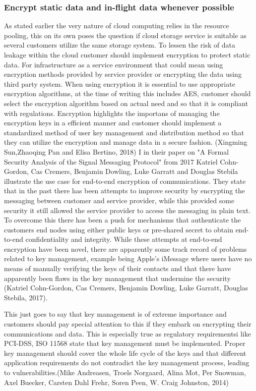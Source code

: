 \documentclass{article}
\begin{document}
\subsubsection{Encrypt static data and in-flight data whenever possible}
As stated earlier the very nature of cloud computing relies in the resource pooling, this on its own poses the question if cloud storage service is suitable as several customers utilize the same storage system. To lessen the risk of data leakage within the cloud customer should implement encryption to protect static data. For infrastructure as a service environment that could mean using encryption methods provided by service provider or encrypting the data using third party system. When using encryption it is essential to use appropriate encryption algorithms, at the time of writing this includes AES, customer should select the encryption algorithm based on actual need and so that it is compliant with regulations. Encryption highlights the importans of managing the encryption keys in a efficient manner and customer should implement a standardized method of user key management and distribution method so that they can utilize the encryption and manage data in a secure fashion. (Xingming Sun,Zhaoqing Pan and Elisa Bertino, 2018)
I in their paper on "A Formal Security Analysis of the Signal Messaging Protocol" from 2017 Katriel Cohn-Gordon, Cas Cremers, Benjamin Dowling, Luke Garratt and Douglas Stebila illustrate the use case for end-to-end encryption of communications.
They state that in the past there has been attempts to improve security by encrypting the messaging between customer and service provider, while this provided some security it still allowed the service provider to access the messaging in plain text.
To overcome this there has been a push for mechanisms that authenticate the customers end nodes using either public keys or pre-shared secret to obtain end-to-end confidentiality and integrity.
While these attempts at end-to-end encryption have been novel, there are apparently some track record of problems related to key management, example being Apple's iMessage where users have no means of manually verifying the keys of their contacts and that there have apparently been flaws in the key management that undermine the security (Katriel Cohn-Gordon, Cas Cremers, Benjamin Dowling, Luke Garratt, Douglas Stebila, 2017).
\par
This just goes to say that key management is of extreme importance and customers should pay special attention to this if they embark on encrypting their communications and data. This is especially true as regulatory requirementsi like PCI-DSS, ISO 11568 state that key management must be implemented. Proper key management should cover the whole life cycle of the keys and that different application requirements do not contradict the key management process, leading to vulnerabilities.(Mike Andreasen, Troels Norgaard, Alina Mot, Per Snowman, Axel Buecker, Carsten Dahl Frehr, Soren Peen, W. Craig Johnston, 2014)
\end{document}
